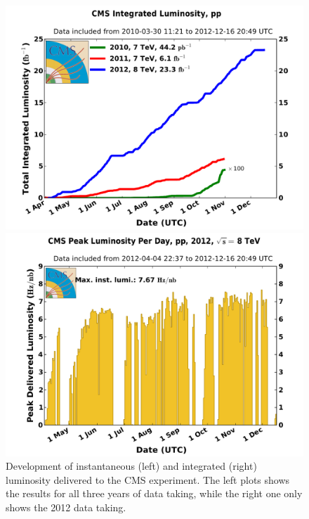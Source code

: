 \begin{figure}[htbp]
\centering
\begin{minipage}[t]{0.49\textwidth}
  \includegraphics[width=\textwidth]{plots/LHC/int_lumi_cumulative_pp_2.pdf}
\end{minipage}
\begin{minipage}[t]{0.49\textwidth}
\includegraphics[width=\textwidth]{plots/LHC/peak_lumi_per_day_pp_2012.pdf}
\end{minipage}
\caption{Development of instantaneous (left) and integrated (right) luminosity delivered to the CMS experiment. The left plots shows the results for all three years of data taking, while the right one only shows the 2012 data taking.}
\label{fig:lumiOverview}
\end{figure}